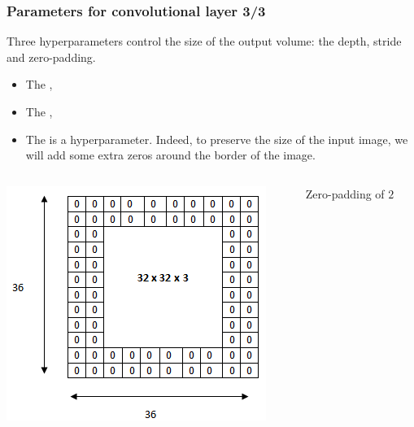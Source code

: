 \begin{frame}
	\frametitle{Parameters for convolutional layer 3/3}

	Three hyperparameters control the size of the output volume: the depth, stride and zero-padding.

	\begin{itemize}
		\item The ,

		\item The ,

		\item The  is a hyperparameter. Indeed, to preserve the size of the input image, we will add some extra zeros around the border of the image.
	\end{itemize}

		\begin{columns}[T] %
		\hspace{0.2cm}
			\begin{column}{.5\textwidth}
			\vspace{-0.5cm}
			\begin{center}
				\includegraphics[scale=0.5]{figs/Pad}
			\end{center}
		\end{column}

	\begin{column}{.5\textwidth}
			\vspace{1.5cm}
			\hspace{1.5cm}
				Zero-padding of $2$
	\end{column}%
	\end{columns}


\end{frame}


